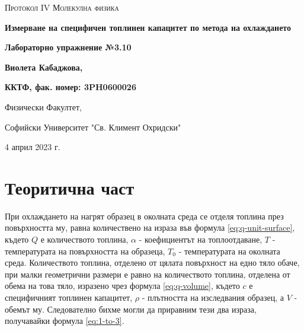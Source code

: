 \documentclass[12pt]{article}
\begin{document}
\begin{titlepage}
	\flushleft
	{\scshape\Large Протокол IV \hspace{2cm} Молекулна физика\par}
	\vspace{4cm}
	{\huge\bfseries Измерване на специфичен топлинен капацитет по метода на охлаждането\par}
	\vspace{1cm}
	{\LARGE\bfseries Лабораторно упражнение №3.10\par}
	\vspace{5cm}
    {\LARGE\bfseries Виолета Кабаджова, \par}
    {\large\bfseries ККТФ, фак. номер: 3PH0600026\par}
	\vspace{1cm}
	
	{\large Физически Факултет, 
	
	Софийски Университет "Св. Климент Охридски"
	
	4 април 2023 г.\par}
	
\end{titlepage}

\section{Теоритична част}\label{sec:theoretical-part}
При охлаждането на нагрят образец в околната среда се отделя топлина през повърхността му, равна количествено на израза във формула \ref{eq:q-unit-surface}, където $Q$ е количеството топлина, $\alpha$ - коефициентът на топлоотдаване, $T$ - температурата на повърхността на образеца, $T_0$ - температурата на околната среда. Количеството топлина, отделено от цялата повърхност на едно тяло обаче, при малки геометрични размери е равно на количеството топлина, отделена от обема на това тяло, изразено чрез формула \ref{eq:q-volume}, където $c$ е специфичният топлинен капацитет, $\rho$ - плътността на изследвания образец, а $V$ - обемът му. Следователно бихме могли да приравним тези два израза, получавайки формула \ref{eq:1-to-3}.
\end{document}

